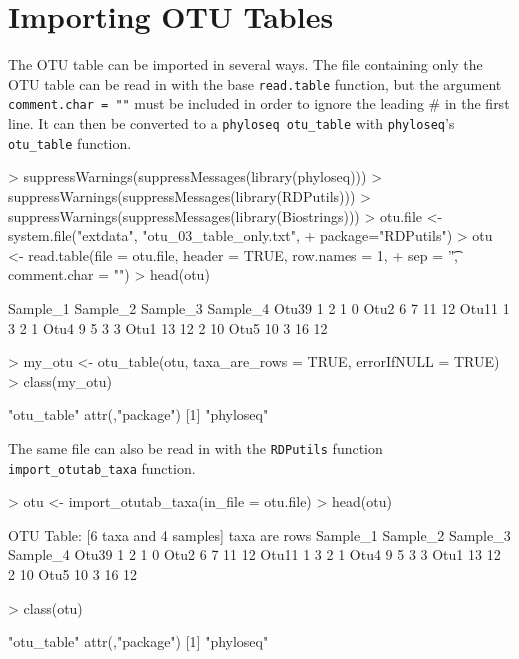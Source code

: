\documentclass{article}
\begin{document}
\section*{Importing OTU Tables}

The OTU table can be imported in several ways. The file containing only the OTU table can be read in with the base \texttt{read.table} function, but the argument \texttt{comment.char = ""} must be included in order to ignore the leading \# in the first line. It can then be converted to a \texttt{phyloseq otu\_table} with \texttt{phyloseq}'s \texttt{otu\_table} function.  

\begin{Schunk}
\begin{Sinput}
> suppressWarnings(suppressMessages(library(phyloseq)))
> suppressWarnings(suppressMessages(library(RDPutils)))
> suppressWarnings(suppressMessages(library(Biostrings)))
> otu.file <- system.file("extdata", "otu_03_table_only.txt",
+                         package="RDPutils")
> otu <- read.table(file = otu.file, header = TRUE, row.names = 1, 
+                   sep = '\t', comment.char = "")
> head(otu)
\end{Sinput}
\begin{Soutput}
      Sample_1 Sample_2 Sample_3 Sample_4
Otu39        1        2        1        0
Otu2         6        7       11       12
Otu11        1        3        2        1
Otu4         9        5        3        3
Otu1        13       12        2       10
Otu5        10        3       16       12
\end{Soutput}
\begin{Sinput}
> my_otu <- otu_table(otu, taxa_are_rows = TRUE, errorIfNULL = TRUE)
> class(my_otu)
\end{Sinput}
\begin{Soutput}
[1] "otu_table"
attr(,"package")
[1] "phyloseq"
\end{Soutput}
\end{Schunk}

The same file can also be read in with the \texttt{RDPutils} function \texttt{import\_otutab\_taxa} function.  

\begin{Schunk}
\begin{Sinput}
> otu <- import_otutab_taxa(in_file = otu.file)
> head(otu)
\end{Sinput}
\begin{Soutput}
OTU Table:          [6 taxa and 4 samples]
                     taxa are rows
      Sample_1 Sample_2 Sample_3 Sample_4
Otu39        1        2        1        0
Otu2         6        7       11       12
Otu11        1        3        2        1
Otu4         9        5        3        3
Otu1        13       12        2       10
Otu5        10        3       16       12
\end{Soutput}
\begin{Sinput}
> class(otu)
\end{Sinput}
\begin{Soutput}
[1] "otu_table"
attr(,"package")
[1] "phyloseq"
\end{Soutput}
\end{Schunk}
\end{document}
